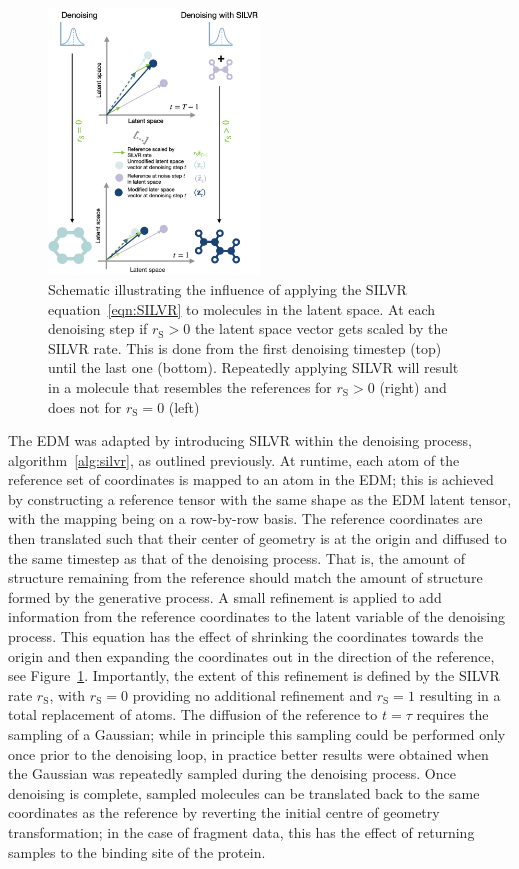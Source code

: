 \documentclass[journal=jacsat,manuscript=article]{achemso}
\begin{document}
\begin{figure}
    \centering
    \includegraphics[width=0.5\textwidth]{paper/Figures/Fig2/fig2.jpg}
    \caption{Schematic illustrating the influence of applying the SILVR equation~\ref{eqn:SILVR} to molecules in the latent space. At each denoising step if $r_{\mathrm{S}}>0$ the latent space vector gets scaled by the SILVR rate. This is done from the first denoising timestep (top) until the last one (bottom). Repeatedly applying SILVR will result in a molecule that resembles the references for $r_{\mathrm{S}}>0$ (right) and does not for $r_{\mathrm{S}}=0$ (left)}
    \label{fig:silvr_explanation}
\end{figure}

The EDM was adapted by introducing SILVR within the denoising process, algorithm~\ref{alg:silvr}, as outlined previously. At runtime, each atom of the reference set of coordinates is mapped to an atom in the EDM; this is achieved by constructing a reference tensor with the same shape as the EDM latent tensor, with the mapping being on a row-by-row basis. The reference coordinates are then translated such that their center of geometry is at the origin and diffused to the same timestep as that of the denoising process. That is, the amount of structure remaining from the reference should match the amount of structure formed by the generative process. A small refinement is applied to add information from the reference coordinates to the latent variable of the denoising process. This equation has the effect of shrinking the coordinates towards the origin and then expanding the coordinates out in the direction of the reference, see Figure~\ref{fig:silvr_explanation}. Importantly, the extent of this refinement is defined by the SILVR rate $r_{\mathrm{S}}$, with $r_{\mathrm{S}}=0$ providing no additional refinement and $r_{\mathrm{S}}=1$ resulting in a total replacement of atoms. The diffusion of the reference to $t=\tau$ requires the sampling of a Gaussian; while in principle this sampling could be performed only once prior to the denoising loop, in practice better results were obtained when the Gaussian was repeatedly sampled during the denoising process. Once denoising is complete, sampled molecules can be translated back to the same coordinates as the reference by reverting the initial centre of geometry transformation; in the case of fragment data, this has the effect of returning samples to the binding site of the protein.
\end{document}
